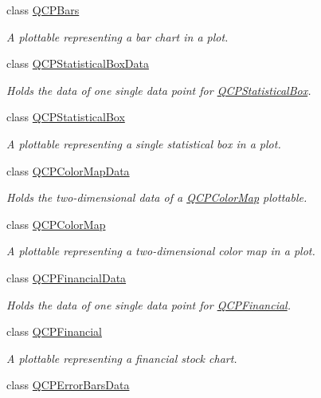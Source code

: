 \begin{DoxyCompactItemize}
class \hyperlink{class_q_c_p_bars}{Q\+C\+P\+Bars}
\begin{DoxyCompactList}\small\item\em A plottable representing a bar chart in a plot. \end{DoxyCompactList}\item 
class \hyperlink{class_q_c_p_statistical_box_data}{Q\+C\+P\+Statistical\+Box\+Data}
\begin{DoxyCompactList}\small\item\em Holds the data of one single data point for \hyperlink{class_q_c_p_statistical_box}{Q\+C\+P\+Statistical\+Box}. \end{DoxyCompactList}\item 
class \hyperlink{class_q_c_p_statistical_box}{Q\+C\+P\+Statistical\+Box}
\begin{DoxyCompactList}\small\item\em A plottable representing a single statistical box in a plot. \end{DoxyCompactList}\item 
class \hyperlink{class_q_c_p_color_map_data}{Q\+C\+P\+Color\+Map\+Data}
\begin{DoxyCompactList}\small\item\em Holds the two-\/dimensional data of a \hyperlink{class_q_c_p_color_map}{Q\+C\+P\+Color\+Map} plottable. \end{DoxyCompactList}\item 
class \hyperlink{class_q_c_p_color_map}{Q\+C\+P\+Color\+Map}
\begin{DoxyCompactList}\small\item\em A plottable representing a two-\/dimensional color map in a plot. \end{DoxyCompactList}\item 
class \hyperlink{class_q_c_p_financial_data}{Q\+C\+P\+Financial\+Data}
\begin{DoxyCompactList}\small\item\em Holds the data of one single data point for \hyperlink{class_q_c_p_financial}{Q\+C\+P\+Financial}. \end{DoxyCompactList}\item 
class \hyperlink{class_q_c_p_financial}{Q\+C\+P\+Financial}
\begin{DoxyCompactList}\small\item\em A plottable representing a financial stock chart. \end{DoxyCompactList}\item 
class \hyperlink{class_q_c_p_error_bars_data}{Q\+C\+P\+Error\+Bars\+Data}

\end{DoxyCompactItemize}
